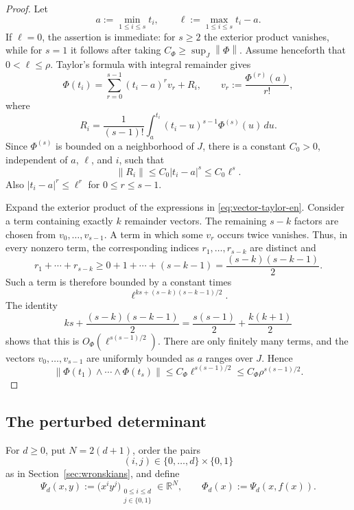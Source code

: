 \documentclass[11pt]{amsart}
\numberwithin{equation}{section}
\theoremstyle{definition}
\theoremstyle{remark}
\newcommand{\R}{\mathbb R}
\newcommand{\norm}[1]{\left\lVert #1\right\rVert}
\newcommand{\abs}[1]{\left\lvert #1\right\rvert}
\begin{document}
\begin{proof}
Let
\[
a:=\min_{1\leq i\leq s}t_i,
\qquad
\ell:=\max_{1\leq i\leq s}t_i-a.
\]
If $\ell=0$, the assertion is immediate: for $s\geq2$ the exterior
product vanishes, while for $s=1$ it follows after taking
$C_\Phi\geq\sup_J\norm{\Phi}$. Assume henceforth that
$0<\ell\leq\rho$. Taylor's formula with integral remainder gives
\begin{equation}\label{eq:vector-taylor-en}
\Phi(t_i)
=
\sum_{r=0}^{s-1}(t_i-a)^rv_r+R_i,
\qquad
v_r:=\frac{\Phi^{(r)}(a)}{r!},
\end{equation}
where
\[
R_i
=
\frac{1}{(s-1)!}
\int_a^{t_i}(t_i-u)^{s-1}\Phi^{(s)}(u)\,du.
\]
Since $\Phi^{(s)}$ is bounded on a neighborhood of $J$, there is a
constant $C_0>0$, independent of $a$, $\ell$, and $i$, such that
\begin{equation}\label{eq:remainder-bound-en}
\norm{R_i}\leq C_0\abs{t_i-a}^s\leq C_0\ell^s.
\end{equation}
Also $\abs{t_i-a}^r\leq\ell^r$ for $0\leq r\leq s-1$.

Expand the exterior product of the expressions in
\eqref{eq:vector-taylor-en}. Consider a term containing exactly $k$
remainder vectors. The remaining $s-k$ factors are chosen from
$v_0,\ldots,v_{s-1}$. A term in which some $v_r$ occurs twice vanishes.
Thus, in every nonzero term, the corresponding indices
$r_1,\ldots,r_{s-k}$ are distinct and
\[
r_1+\cdots+r_{s-k}
\geq
0+1+\cdots+(s-k-1)
=
\frac{(s-k)(s-k-1)}{2}.
\]
Such a term is therefore bounded by a constant times
\[
\ell^{ks+(s-k)(s-k-1)/2}.
\]
The identity
\[
ks+\frac{(s-k)(s-k-1)}{2}
=
\frac{s(s-1)}{2}+\frac{k(k+1)}{2}
\]
shows that this is
$O_\Phi(\ell^{s(s-1)/2})$. There are only finitely many terms, and the
vectors $v_0,\ldots,v_{s-1}$ are uniformly bounded as $a$ ranges over
$J$. Hence
\[
\norm{\Phi(t_1)\wedge\cdots\wedge\Phi(t_s)}
\leq C_\Phi\ell^{s(s-1)/2}
\leq C_\Phi\rho^{s(s-1)/2}.
\]
\end{proof}

\subsection{The perturbed determinant}

For $d\geq0$, put $N=2(d+1)$, order the pairs
\[
(i,j)\in\{0,\ldots,d\}\times\{0,1\}
\]
as in Section~\ref{sec:wronskians}, and define
\begin{equation}\label{eq:Psi-d-en}
\Psi_d(x,y):=\bigl(x^iy^j\bigr)_{
\substack{0\leq i\leq d\\j\in\{0,1\}}}\in\R^N,
\qquad
\Phi_d(x):=\Psi_d(x,f(x)).
\end{equation}
\end{document}
